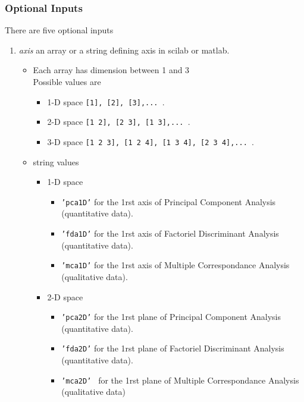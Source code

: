 \subsubsection{Optional Inputs}
There are five optional inputs

\begin{enumerate}
  \item {\em axis} an  array or a string defining axis in scilab or matlab.

	\begin{itemize}
 \item Each array has dimension between 1 and 3 \\
Possible values are
	\begin{itemize}
    \item 1-D space {\tt [1], [2], [3],... }.
    \item 2-D space {\tt [1 2], [2 3], [1 3],... }.
    \item 3-D space {\tt [1 2 3], [1 2 4], [1 3 4], [2 3 4],... }.
	\end{itemize}
 \item string values
	\begin{itemize}
    \item 1-D space
			\begin{itemize}
			\item {\tt 'pca1D'} for the 1rst axis of Principal Component Analysis (quantitative data).
			\item {\tt 'fda1D'} for the 1rst axis of Factoriel Discriminant Analysis (quantitative data).
                        \item {\tt 'mca1D'} for the 1rst axis of Multiple Correspondance Analysis (qualitative data).
			\end{itemize}
    \item 2-D space
			\begin{itemize}
			\item {\tt 'pca2D'} for the 1rst plane of Principal Component Analysis (quantitative data).
			\item {\tt 'fda2D'} for the 1rst plane of Factoriel Discriminant Analysis (quantitative data).
			\item {\tt 'mca2D' } for the 1rst plane of Multiple Correspondance Analysis (qualitative data)

\end{itemize}
\end{itemize}
\end{itemize}
\end{enumerate}
